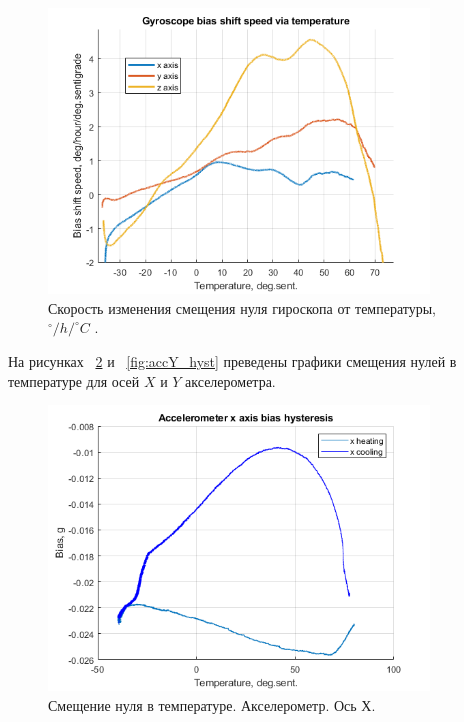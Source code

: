 \documentclass[a4paper,12pt]{article}
\begin{document}
\begin{figure}
\centering
\includegraphics[width=0.9\textwidth]{gradient_labeled.png} 
\caption{\label{fig:gradi} Скорость изменения смещения нуля гироскопа от температуры, $^{\circ}/h/^{\circ}C$ .}
\end{figure}

На рисунках ~\ref{fig:accX_hyst} и ~\ref{fig:accY_hyst} преведены графики смещения нулей в температуре для осей $X$ и $Y$ акселерометра.

\begin{figure}
\centering
\includegraphics[width=0.9\textwidth]{AccX_hyst.png} 
\caption{\label{fig:accX_hyst} Смещение нуля в температуре. Акселерометр. Ось Х.}
\end{figure}
\end{document}
